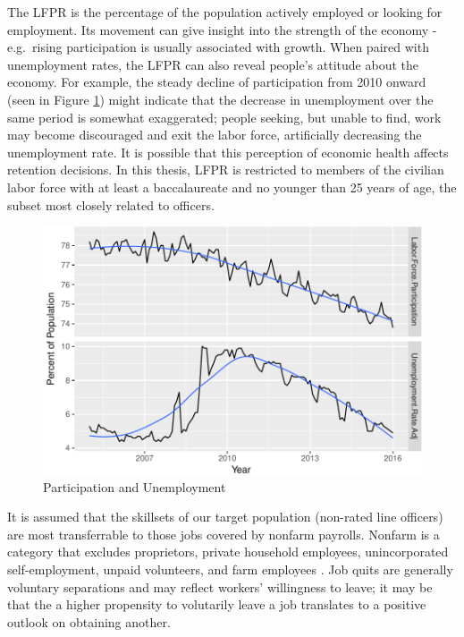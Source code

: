 \documentclass[12pt,letterpaper,toc=flat,oneside]{report}
\theoremstyle{definition}
\theoremstyle{definition}
\theoremstyle{definition}
\theoremstyle{remark}
\begin{document}
The LFPR is the percentage of the population actively employed or
looking for employment. Its movement can give insight into the strength
of the economy - e.g.~rising participation is usually associated with
growth. When paired with unemployment rates, the LFPR can also reveal
people's attitude about the economy. For example, the steady decline of
participation from 2010 onward (seen in Figure
\ref{fig:lfpr-unemployment}) might indicate that the decrease in
unemployment over the same period is somewhat exaggerated; people
seeking, but unable to find, work may become discouraged and exit the
labor force, artificially decreasing the unemployment rate. It is
possible that this perception of economic health affects retention
decisions. In this thesis, LFPR is restricted to members of the civilian
labor force with at least a baccalaureate and no younger than 25 years
of age, the subset most closely related to officers.

\begin{figure}[H]

{\centering \includegraphics{elliott-econometric-personnel-retention-18_files/figure-latex/lfpr-unemployment-1} 

}

\caption{Participation and Unemployment}\label{fig:lfpr-unemployment}
\end{figure}

It is assumed that the skillsets of our target population (non-rated
line officers) are most transferrable to those jobs covered by nonfarm
payrolls. Nonfarm is a category that excludes proprietors, private
household employees, unincorporated self-employment, unpaid volunteers,
and farm employees \cite{fred-nonfarm-2017}. Job quits are generally
voluntary separations and may reflect workers' willingness to leave; it
may be that the a higher propensity to volutarily leave a job translates
to a positive outlook on obtaining another.
\end{document}

